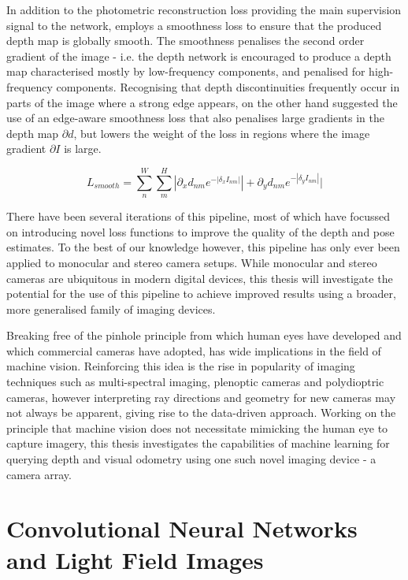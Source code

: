 \documentclass[openany]{book}
\begin{document}
In addition to the photometric reconstruction loss providing the main supervision signal to the network, \cite{zhou2017unsupervised} employs a smoothness loss to ensure that the produced depth map is globally smooth. The smoothness penalises the second order gradient of the image - i.e. the depth network is encouraged to produce a depth map characterised mostly by low-frequency components, and penalised for high-frequency components. Recognising that depth discontinuities frequently occur in parts of the image where a strong edge appears, \cite{godard2016consistency} on the other hand suggested the use of an edge-aware smoothness loss that also penalises large gradients in the depth map $\partial{d}$, but lowers the weight of the loss in regions where the image gradient $\partial{I}$ is large. 

\begin{equation}
    L_{smooth} =  \sum_n^W \sum_m^H |\partial_x d_{nm} e^{-|\delta_x I_{nm}|}| + \partial_y d_{nm} e^{-|\delta_y I_{nm}|}|
\end{equation}

There have been several iterations \cite{godard2016consistency, godard2018selfsupervised, zhan2018deepfeature} of this pipeline, most of which have focussed on introducing novel loss functions to improve the quality of the depth and pose estimates. To the best of our knowledge however, this pipeline has only ever been applied to monocular and stereo camera setups. While monocular and stereo cameras are ubiquitous in modern digital devices, this thesis will investigate the potential for the use of this pipeline to achieve improved results using a broader, more generalised family of imaging devices. 

Breaking free of the pinhole principle from which human eyes have developed and which commercial cameras have adopted, has wide implications in the field of machine vision. Reinforcing this idea is the rise in popularity of imaging techniques such as multi-spectral imaging, plenoptic cameras and polydioptric cameras, however interpreting ray directions and geometry for new cameras may not always be apparent, giving rise to the data-driven approach. Working on the principle that machine vision does not necessitate mimicking the human eye to capture imagery, this thesis investigates the capabilities of machine learning for querying depth and visual odometry using one such novel imaging device - a camera array.



\section{Convolutional Neural Networks and Light Field Images}
\end{document}
